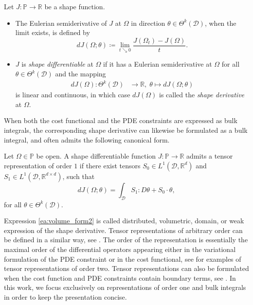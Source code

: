 \documentclass[preprint,9pt]{elsarticle}
\begin{document}
\begin{definition}\label{def1}
Let $J:\mathds{P}\to\mathds{R}$ be a shape function.
\begin{itemize}
	\item[(i)] The Eulerian semiderivative of $J$ at $\Omega$
	in direction $\theta \in \Theta^k(\mathcal{D})$, when the limit exists,
	is defined by
	\begin{equation}
		dJ(\Omega ;\theta)\coloneqq
		\lim_{t\searrow 0}\frac{J(\Omega_t)-J(\Omega)}{t}.
	\end{equation}
	\item[(ii)] $J$ is \textit{shape differentiable} at $\Omega$
	if it has a Eulerian semiderivative at $\Omega$ for all
	$\theta\in\Theta^k(\mathcal{D})$ and the mapping
	\begin{align*}
		dJ(\Omega)\colon \Theta^k(\mathcal{D}) & \to \mathds{R},\;
		\theta\mapsto dJ(\Omega ;\theta)
	\end{align*}
	is linear and continuous, in which case $dJ(\Omega)$
	is called the \textit{shape derivative} at $\Omega$.
\end{itemize}
\end{definition}

When both the cost functional and the PDE constraints are expressed
as bulk integrals, the corresponding shape derivative can likewise be
formulated as a bulk integral, and
often admits the following canonical form.

\begin{definition}\label{def:tensor2}
	Let $\Omega\in\mathds{P}$ be open.
	A shape differentiable function $J\colon\mathds{P}\to\mathds{R}$ admits
	a tensor representation of order $1$ if
	there exist tensors $S_0\in L^1(\mathcal{D},\mathds{R}^{d})$  and
	$S_1\in L^1(\mathcal{D},\mathds{R}^{d\times d})$, such that
	\begin{equation}\label{ea:volume_form2}
	dJ(\Omega;\theta)=\int_\mathcal{D} S_1 : D\theta +  S_0\cdot \theta,
	\end{equation}
	for all $\theta\in\Theta^k(\mathcal{D})$. 
\end{definition}

Expression \eqref{ea:volume_form2} is called distributed, volumetric, domain,
or weak expression of the shape derivative.
Tensor representations of arbitrary order can be defined in a similar way,
see \cite{MR3535238}.
The order of the representation is essentially the maximal order of
the differential operators appearing either in the variational formulation of
the PDE constraint or in the cost functional, see \cite{MR4531392,LL2024}
for examples of tensor representations of order two. 
Tensor representations can also be formulated when the cost function and
PDE constraints contain boundary terms, see \cite{MR3535238}.
In this work, we focus exclusively on representations of order one and
bulk integrals in order to keep the presentation concise.
\end{document}

